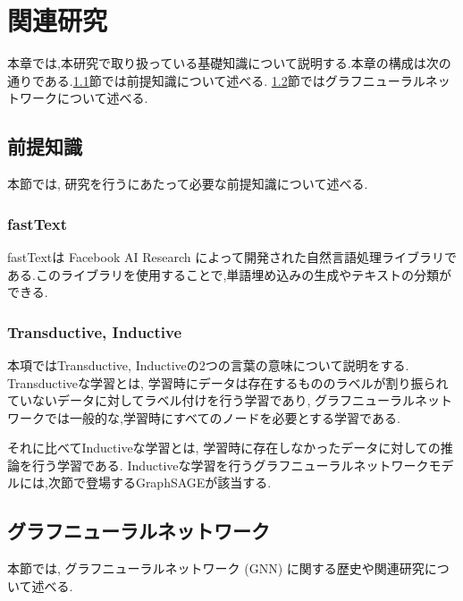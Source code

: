 \documentclass[a4j,twoside,12pt,dvipdfmx]{thesis} %
\begin{document}
\addtocounter{chapter}{+1}

\setlength{\baselineskip}{1.95zw}
\setlength{\textheight}{30\baselineskip}
\mainmatter

\fi
%
\newcommand{\argminnnn}{\mathop{\rm arg~min}\limits}
\renewcommand\thefootnote{\arabic{footnote})}
\def\vector#1{\mbox{\boldmath $#1$}}

\chapter{関連研究}\label{rel}
本章では,本研究で取り扱っている基礎知識について説明する.本章の構成は次の通りである.\ref{rel:preKnowledge}節では前提知識について述べる. \ref{rel:GNN}節ではグラフニューラルネットワークについて述べる.

\section{前提知識}\label{rel:preKnowledge}
本節では, 研究を行うにあたって必要な前提知識について述べる.
\subsection{fastText}
fastText\cite{bojanowski2017enriching}は Facebook AI Research によって開発された自然言語処理ライブラリである.このライブラリを使用することで,単語埋め込みの生成やテキストの分類ができる.
\subsection{Transductive, Inductive}
本項ではTransductive, Inductiveの2つの言葉の意味について説明をする.
Transductiveな学習とは, 学習時にデータは存在するもののラベルが割り振られていないデータに対してラベル付けを行う学習であり, グラフニューラルネットワークでは一般的な,学習時にすべてのノードを必要とする学習である.
\par それに比べてInductiveな学習とは, 学習時に存在しなかったデータに対しての推論を行う学習である. Inductiveな学習を行うグラフニューラルネットワークモデルには,次節で登場するGraphSAGEが該当する.


\section{グラフニューラルネットワーク}\label{rel:GNN}
本節では, グラフニューラルネットワーク (GNN) に関する歴史や関連研究について述べる.
\end{document}
